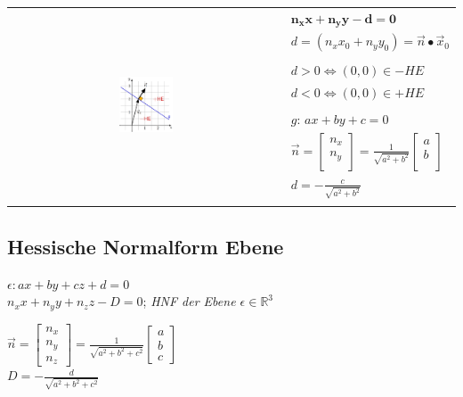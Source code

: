 \begin{tabular}{cl}
    \multirow{10}{*}{
        \includegraphics[width=0.2\textwidth]{assets/hessischenormalfromebene.png}
    }
     & $\mathbf{n_x x + n_y y - d = 0}$ \\
     & $d = (n_x x_0 + n_y y_0) = \vec{n} \bullet \vec{x}_0$\\
     & \\
     & $d > 0 \Leftrightarrow (0,0) \in -HE $ \\
     & $d < 0 \Leftrightarrow (0,0) \in +HE $ \\
     & \\
     & $g$: $ax + by + c = 0$\\
     & $\vec{n} = \begin{bmatrix}
         n_x \\
         n_y \\
     \end{bmatrix} = \frac{1}{\sqrt{a^2 + b^2}} \begin{bmatrix}
         a \\
         b \\
     \end{bmatrix}$ \\
     & $d = - \frac{c}{\sqrt{a^2 + b^2}}$ \\
     & \\
\end{tabular}

\subsection{Hessische Normalform Ebene}

$\epsilon: ax + by + cz + d = 0$ \\

$n_x x + n_y y + n_z z - D = 0$;
\textit{HNF der Ebene $\epsilon \in \mathbb{R}^3$}

$\vec{n} = \begin{bmatrix}
    n_x \\
    n_y \\
    n_z
\end{bmatrix} = \frac{1}{\sqrt{a^2 + b^2 + c^2}} \begin{bmatrix}
    a \\
    b \\
    c
\end{bmatrix} $ \\
$D = - \frac{d}{\sqrt{a^2 + b^2 + c^2}}$

